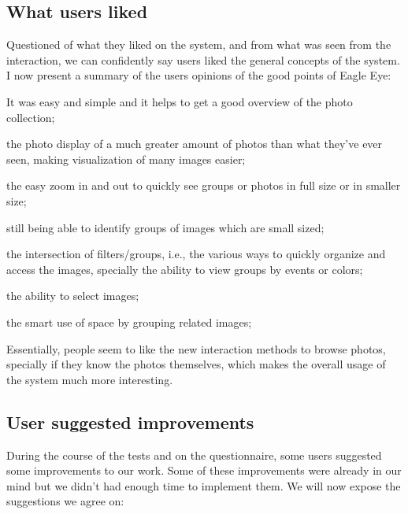 \subsection{What users liked}

Questioned of what they liked on the system, and from what was seen from the interaction, we can confidently say users liked the general concepts of the system. I now present a summary of the users opinions of the good points of Eagle Eye:

\pagebreak

\begin{myitemize}
\item It was easy and simple and it helps to get a good overview of the photo collection;
\item the photo display of a much greater amount of photos than what they've ever seen, making visualization of many images easier;
\item the easy zoom in and out to quickly see groups or photos in full size or in smaller size;
\item still being able to identify groups of images which are small sized;
\item the intersection of filters/groups, i.e., the various ways to quickly organize and access the images, specially the ability to view groups by events or colors;
\item the ability to select images;
\item the smart use of space by grouping related images;
\end{myitemize}

Essentially, people seem to like the new interaction methods to browse photos, specially if they know the photos themselves, which makes the overall usage of the system much more interesting.




\subsection{User suggested improvements}

During the course of the tests and on the questionnaire, some users suggested some improvements to our work. Some of these improvements were already in our mind but we didn't had enough time to implement them. We will now expose the suggestions we agree on:

